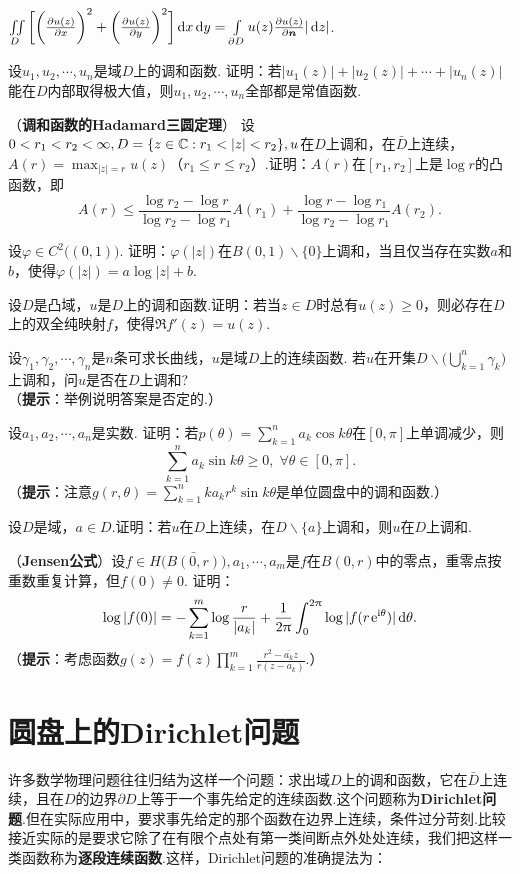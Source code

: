 \begin{xiti}
\begin{enuma}
      \item $\iint\limits_D\bigg[\bigg(\frac{\partial u(z)}{\partial x}\bigg)^2+\bigg(\frac{\partial u(z)}{\partial y}\bigg)^2\bigg]
         \mathop{}\!\mathrm dx\mathop{}\!\mathrm dy=\int\limits_{\partial D}u(z)\frac{\partial u(z)}{\partial \boldsymbol n}|\mathop{}\!\mathrm dz|$.
    \end{enuma}
  \item 设$u_1,u_2,\cdots,u_n$是域$D$上的调和函数. 证明：若$|u_1(z)|+|u_2(z)|+\cdots+|u_n(z)|$能在$D$内部取得极大值，则$u_1,u_2,\cdots,u_n$全部都是常值函数.
  \item （\textbf{调和函数的Hadamard三圆定理}）
      设$0<r_1<r_2<\infty,D=\{z\in\MC:r_1<|z|<r_2\},u$在$D$上调和，在$\bar D$上连续，$A(r)=\max_{|z|=r}u(z)$（$r_1\le r\le r_2$）.证明：$A(r)$在$[r_1,r_2]$上是$\log r$的凸函数，即
      \[
        A(r)\le\frac{\log r_2-\log r}{\log r_2-\log r_1}A(r_1)+\frac{\log r-\log r_1}
        {\log r_2-\log r_1}A(r_2).
      \]
  \item 设$\varphi\in C^2\big((0,1)\big)$. 证明：$\varphi(|z|)$在$B(0,1)\backslash\{0\}$上调和，当且仅当存在实数$a$和$b$，使得$\varphi(|z|)=a\log|z|+b$.
  \item 设$D$是凸域，$u$是$D$上的调和函数.证明：若当$z\in D$时总有$u(z)\ge0$，则必存在$D$上的双全纯映射$f$，使得$\Re f'(z)=u(z)$.
  \item 设$\gamma_1,\gamma_2,\cdots,\gamma_n$是$n$条可求长曲线，$u$是域$D$上的连续函数. 若$u$在开集$D\backslash\big(\bigcup_{k=1}^n\gamma_k\big)$上调和，问$u$是否在$D$上调和?\\
     （\textbf{提示}：举例说明答案是否定的.）
  \item 设$a_1,a_2,\cdots,a_n$是实数. 证明：若$p(\theta)=\sum_{k=1}^na_k\cos k\theta$在$[0,\pi]$上单调减少，则
     \[
       \sum_{k=1}^n a_k\sin k\theta\ge0,\;\forall \theta\in[0,\pi].
     \]
    （\textbf{提示}：注意$g(r,\theta)=\sum_{k=1}^nka_kr^k\sin k\theta$是单位圆盘中的调和函数.）
  \item 设$D$是域，$a\in D$.证明：若$u$在$D$上连续，在$D\backslash\{a\}$上调和，则$u$在$D$上调和.
  \item （\textbf{Jensen公式}）设$f\in H\big(\bar{B(0,r)}\big),a_1,\cdots,a_m$是$f$在$B(0,r)$中的零点，重零点按重数重复计算，但$f(0)\ne0$. 证明：
      \[
        \log|f(0)|=-\sum_{k=1}^m\log\frac r{|a_k|}+\frac1{2\uppi}\int_0^{2\uppi}
       \log|f(r\operatorname{\!\!\;\mathrm e}^{\mathrm i\theta})|\mathop{}\!\mathrm{d} \theta.
      \]
      （\textbf{提示}：考虑函数$g(z)=f(z)\prod_{k=1}^m\frac{r^2-\bar{a_k}z}{r(z-a_k)}$.）
\end{xiti}

\section{圆盘上的Dirichlet问题\label{sec8.2}}
许多数学物理问题往往归结为这样一个问题：求出域$D$上的调和函数，它在$\bar D$上连续，且在$D$的边界$\partial D$上等于一个事先给定的连续函数.这个问题称为\textbf{Dirichlet问题}.但在实际应用中，要求事先给定的那个函数在边界上连续，条件过分苛刻.比较接近实际的是要求它除了在有限个点处有第一类间断点外处处连续，我们把这样一类函数称为\textbf{逐段连续函数}.这样，Dirichlet问题的准确提法为：

